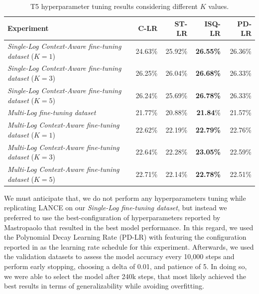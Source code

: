 \begin{table}[h!]
	\centering
	\caption{T5 hyperparameter tuning results considering different $K$ values.}
	\begin{tabular}{lrrrr}
		\toprule
		\textbf{Experiment}                  																		& \textbf{C-LR}              & \textbf{ST-LR}      & \textbf{ISQ-LR}        & \textbf{PD-LR} \\
		\midrule
		\textit{Single-Log Context-Aware fine-tuning dataset} ($K=1$)                         &   24.63\%                & 25.92\%    		           & \textbf{26.55\%}           &  26.36\%         \\
		\textit{Single-Log Context-Aware fine-tuning dataset} ($K=3$)                        &   26.25\%                & 26.04\%    		           & \textbf{26.68\%}          &  26.33\%         \\
		\textit{Single-Log Context-Aware fine-tuning dataset} ($K=5$)                         &  26.24\%                & 25.69\%    		           & \textbf{26.78\%}           &  26.33\%         \\
		\bottomrule
		\textit{Multi-Log fine-tuning dataset}                       										&   21.77\%                & 20.88\%    		           & \textbf{21.84}\%           &  21.57\%         \\
		\bottomrule
		\textit{Multi-Log Context-Aware fine-tuning dataset} ($K=1$)                         &   22.62\%                & 22.19\%    		           & \textbf{22.79\%}           &  22.76\%         \\
		\textit{Multi-Log Context-Aware fine-tuning dataset} ($K=3$)                        &   22.64\%                & 22.28\%    		           & \textbf{23.05\%}          &  22.59\%         \\
		\textit{Multi-Log Context-Aware fine-tuning dataset} ($K=5$)                         &   22.71\%                & 22.14\%    		           & \textbf{22.78\%}           &  22.51\%         \\
		\bottomrule
	\end{tabular}
	
	\label{tab:hp-results}
\end{table}


We must anticipate that, we do not perform any hyperparameters tuning while replicating LANCE on our \textit{Single-Log fine-tuning dataset}, but instead we preferred to use the best-configuration of hyperparameters reported by Mastropaolo \etal \cite{mastropaolo2022using} that resulted in the best model performance. In this regard, we used the Polynomial Decay Learning Rate (PD-LR) with featuring the configuration reported in  as the learning rate schedule for this experiment. Afterwards, we used the validation datasets to assess the model accuracy every 10,000 steps and perform early stopping, choosing a delta of 0.01, and patience of 5. In doing so, we were able to select the model after 240k steps, that most likely achieved the best results in terms of generalizability while avoiding overfitting.

